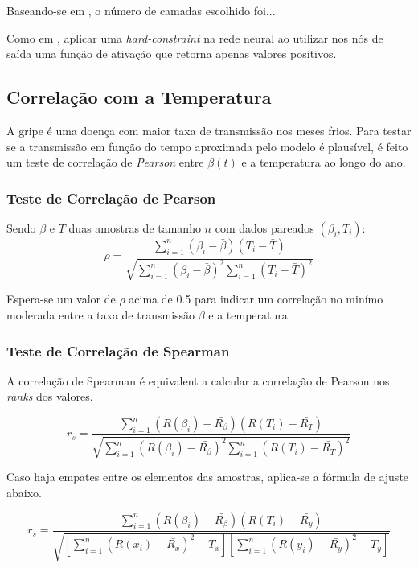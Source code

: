 Baseando-se em \cite{shaier-etal:22-dinns}, o número de camadas escolhido foi...

Como em \cite{millevoi-etal:24-split-join-pinns}, aplicar uma 
\textit{hard-constraint} na rede neural ao utilizar nos nós de saída
uma função de ativação que retorna apenas valores positivos.

\subsection{Correlação com a Temperatura}

A gripe é uma doença com maior taxa de transmissão nos meses frios. 
Para testar se a transmissão em função do tempo aproximada pelo modelo é plausível,
é feito um teste de correlação de \textit{Pearson} entre $\beta(t)$ e a temperatura
ao longo do ano.

\subsubsection{Teste de Correlação de Pearson}

Sendo $\beta$ e $T$ duas amostras de tamanho $n$ com dados pareados $(\beta_i, T_i)$:
\begin{equation}\label{correlacao-de-pearson}
\rho = \frac{\sum_{i=1}^{n} (\beta_i - \bar{\beta})(T_i - \bar{T})}{\sqrt{\sum_{i=1}^{n} (\beta_i - \bar{\beta})^2 \sum_{i=1}^{n} (T_i - \bar{T})^2}}
\end{equation}

Espera-se um valor de $\rho$ acima de 0.5 para indicar um correlação no minímo moderada
entre a taxa de transmissão $\beta$ e a temperatura.

\subsubsection{Teste de Correlação de Spearman}

A correlação de Spearman é equivalent a calcular a correlação de Pearson nos 
\textit{ranks} dos valores.

\begin{equation}
r_s = \frac{\sum_{i=1}^{n} (R(\beta_i) - \bar{R_{\beta}})(R(T_i) - \bar{R_{T}})}{\sqrt{\sum_{i=1}^{n} (R(\beta_i) - \bar{R_{\beta}})^2 \sum_{i=1}^{n} (R(T_i) - \bar{R_T})^2}}
\end{equation}

Caso haja empates entre os elementos das amostras, aplica-se a fórmula de ajuste
abaixo.

\begin{equation}
r_s = \frac{\sum_{i=1}^{n} (R(\beta_i) - \bar{R_{\beta}})(R(T_i) - \bar{R_y})}{\sqrt{\left[\sum_{i=1}^{n} (R(x_i) - \bar{R_x})^2 - T_x\right]\left[\sum_{i=1}^{n} (R(y_i) - \bar{R_y})^2 - T_y\right]}}
\end{equation}

